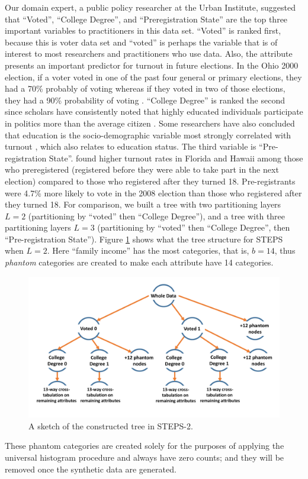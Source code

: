 \documentclass[12pt, A4]{article}
\theoremstyle{plain}
\theoremstyle{exampstyle}\newtheorem{defn}{Definition}
\theoremstyle{exampstyle}\newtheorem{lem}{Lemma}
\theoremstyle{exampstyle}\newtheorem{cor}{Corollary}
\theoremstyle{exampstyle}\newtheorem{pro}{Proposition}
\theoremstyle{exampstyle}\newtheorem{cla}{Claim}
\theoremstyle{exampstyle}\newtheorem{rem}{Remark}
\begin{document}
Our domain expert, a public policy researcher at the Urban Institute, suggested  that ``Voted'', ``College Degree'', and ``Preregistration State'' are the top three important variables to practitioners in this data set. ``Voted'' is ranked first, because this is voter data set and ``voted'' is perhaps the variable that is of interest to most researchers and practitioners who use data. Also, the attribute presents an important predictor for turnout in future elections. In the Ohio 2000 election, if a voter voted in one of the past four general or primary elections, they had a 70\% probably of voting whereas if they voted in two of those elections, they had a 90\% probability of voting \citep{malchow2004predicting}. ``College Degree'' is ranked the second since scholars have consistently noted that highly educated individuals participate in politics more than the average citizen \citep{campbell1980american, rosenstone1993mobilization}. Some researchers have also concluded that education is the socio-demographic variable most strongly correlated with turnout \citep{wolfinger1980votes}, which also relates to education status. The third variable is ``Pre-registration State''. \citet{mcdonald2010registering} found higher turnout rates in Florida and Hawaii among those who preregistered (registered before they were able to take part in the next election) compared to those who registered after they turned 18. Pre-registrants were 4.7\% more likely to vote in the 2008 election than those who registered after they turned 18. For comparison, we built a tree with two partitioning layers $L=2$ (partitioning by ``voted'' then ``College Degree''), and a tree with three partitioning layers $L=3$ (partitioning by ``voted'' then ``College Degree'', then ``Pre-registration State''). Figure \ref{fig:tree} shows what the tree structure for STEPS when $L=2$. Here ``family income'' has the most categories, that is, $b=14$, thus \emph{phantom} categories are created to make each attribute have 14 categories.

\begin{figure}[!htb]
\centerline{\includegraphics[width=6in]{STEPS-figure.pdf}}\vspace{-6pt}
\caption{A sketch of the constructed tree in STEPS-2.}\label{fig:tree}
\end{figure}
These phantom categories  are created solely for the purposes of applying the universal histogram procedure and always have zero counts; and they will be removed once the synthetic data are generated. 
\end{document}
